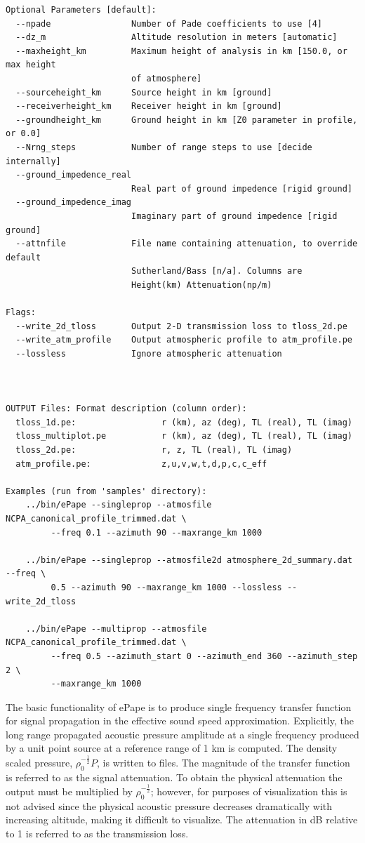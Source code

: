 \begin{verbatim}
Optional Parameters [default]:
  --npade                Number of Pade coefficients to use [4]
  --dz_m                 Altitude resolution in meters [automatic]
  --maxheight_km         Maximum height of analysis in km [150.0, or max height
                         of atmosphere]
  --sourceheight_km      Source height in km [ground]
  --receiverheight_km    Receiver height in km [ground]
  --groundheight_km      Ground height in km [Z0 parameter in profile, or 0.0]
  --Nrng_steps           Number of range steps to use [decide internally]
  --ground_impedence_real
                         Real part of ground impedence [rigid ground]
  --ground_impedence_imag
                         Imaginary part of ground impedence [rigid ground]
  --attnfile             File name containing attenuation, to override default
                         Sutherland/Bass [n/a]. Columns are
                         Height(km) Attenuation(np/m)

Flags:
  --write_2d_tloss       Output 2-D transmission loss to tloss_2d.pe
  --write_atm_profile    Output atmospheric profile to atm_profile.pe
  --lossless             Ignore atmospheric attenuation



OUTPUT Files: Format description (column order):
  tloss_1d.pe:                 r (km), az (deg), TL (real), TL (imag)
  tloss_multiplot.pe           r (km), az (deg), TL (real), TL (imag)
  tloss_2d.pe:                 r, z, TL (real), TL (imag)
  atm_profile.pe:              z,u,v,w,t,d,p,c,c_eff

Examples (run from 'samples' directory):
    ../bin/ePape --singleprop --atmosfile NCPA_canonical_profile_trimmed.dat \
         --freq 0.1 --azimuth 90 --maxrange_km 1000

    ../bin/ePape --singleprop --atmosfile2d atmosphere_2d_summary.dat --freq \
         0.5 --azimuth 90 --maxrange_km 1000 --lossless --write_2d_tloss

    ../bin/ePape --multiprop --atmosfile NCPA_canonical_profile_trimmed.dat \
         --freq 0.5 --azimuth_start 0 --azimuth_end 360 --azimuth_step 2 \
         --maxrange_km 1000

\end{verbatim}

The basic functionality of ePape is to produce single frequency transfer function for signal propagation in the effective sound speed approximation. Explicitly, the long range propagated acoustic pressure amplitude at a single frequency produced by a unit point source at a reference range of 1 km is computed. The density scaled pressure, $\rho_0^{-\frac{1}{2}}P$, is written to files. The magnitude of the transfer function is referred to as the signal attenuation. To obtain the physical attenuation the output must be multiplied by $\rho_0^{-\frac{1}{2}}$; however, for purposes of visualization this is not advised since the physical acoustic pressure decreases dramatically with increasing altitude, making it difficult to visualize. The attenuation in dB relative to 1 is referred to as the transmission loss. 

